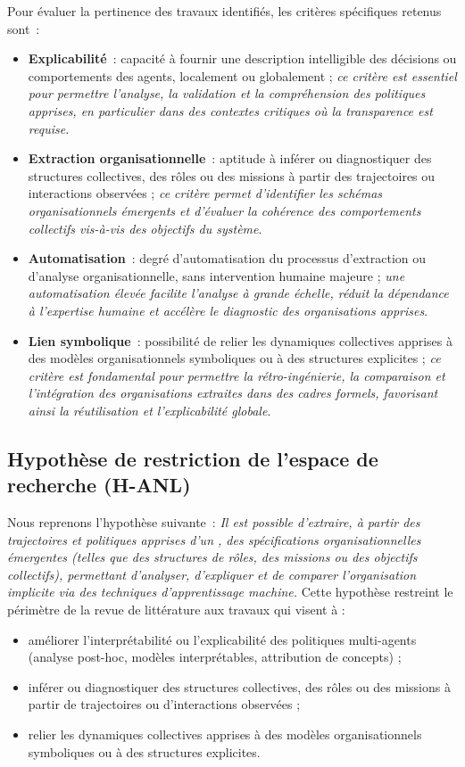 Pour évaluer la pertinence des travaux identifiés, les critères spécifiques retenus sont~:
\begin{itemize}
  \item \textbf{Explicabilité}~: capacité à fournir une description intelligible des décisions ou comportements des agents, localement ou globalement ; \emph{ce critère est essentiel pour permettre l'analyse, la validation et la compréhension des politiques apprises, en particulier dans des contextes critiques où la transparence est requise}.
  \item \textbf{Extraction organisationnelle}~: aptitude à inférer ou diagnostiquer des structures collectives, des rôles ou des missions à partir des trajectoires ou interactions observées ; \emph{ce critère permet d'identifier les schémas organisationnels émergents et d'évaluer la cohérence des comportements collectifs vis-à-vis des objectifs du système}.
  \item \textbf{Automatisation}~: degré d'automatisation du processus d'extraction ou d'analyse organisationnelle, sans intervention humaine majeure ; \emph{une automatisation élevée facilite l'analyse à grande échelle, réduit la dépendance à l'expertise humaine et accélère le diagnostic des organisations apprises}.
  \item \textbf{Lien symbolique}~: possibilité de relier les dynamiques collectives apprises à des modèles organisationnels symboliques ou à des structures explicites ; \emph{ce critère est fondamental pour permettre la rétro-ingénierie, la comparaison et l'intégration des organisations extraites dans des cadres formels, favorisant ainsi la réutilisation et l'explicabilité globale}.
\end{itemize}

\subsection*{Hypothèse de restriction de l'espace de recherche (\textbf{H-ANL})}

Nous reprenons l'hypothèse suivante~: \textit{Il est possible d'extraire, à partir des trajectoires et politiques apprises d'un , des spécifications organisationnelles émergentes (telles que des structures de rôles, des missions ou des objectifs collectifs), permettant d'analyser, d'expliquer et de comparer l'organisation implicite via des techniques d'apprentissage machine.}
Cette hypothèse restreint le périmètre de la revue de littérature aux travaux qui visent à :
\begin{itemize}
  \item améliorer l'interprétabilité ou l'explicabilité des politiques multi-agents (analyse post-hoc, modèles interprétables, attribution de concepts) ;
  \item inférer ou diagnostiquer des structures collectives, des rôles ou des missions à partir de trajectoires ou d'interactions observées ;
  \item relier les dynamiques collectives apprises à des modèles organisationnels symboliques ou à des structures explicites.
\end{itemize}


